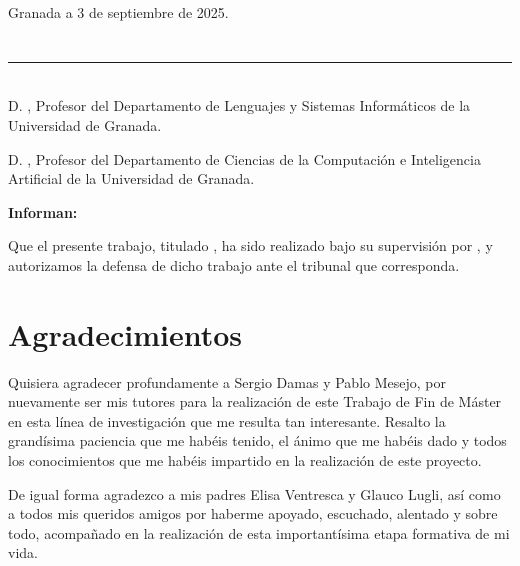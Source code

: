 \vspace{6cm}


\vspace{2cm}

\begin{flushright}
Granada a 3 de septiembre de 2025.
\end{flushright}


\chapter*{}
\thispagestyle{empty}

\noindent\rule[-1ex]{\textwidth}{2pt}\\[4.5ex]

D. \textbf{\myProf}, Profesor del Departamento de Lenguajes y Sistemas Informáticos de la Universidad de Granada.

\vspace{0.25cm}

D. \textbf{\myOtherProf}, Profesor del Departamento de Ciencias de la Computación e Inteligencia Artificial de la Universidad de Granada.


\vspace{0.25cm}

\textbf{Informan:}

\vspace{0.25cm}

Que el presente trabajo, titulado \textit{\textbf{\myTitle}},
ha sido realizado bajo su supervisión por \textbf{\myName}, y autorizamos la defensa de dicho trabajo ante el tribunal
que corresponda.

\vspace{0.5cm}


\vspace{0.5cm}


\vspace{5cm}


\chapter*{Agradecimientos}
\thispagestyle{empty}

\vspace{1cm}

Quisiera agradecer profundamente a Sergio Damas y Pablo Mesejo, por nuevamente ser mis tutores para la realización de este Trabajo de Fin de Máster en esta línea de investigación que me resulta tan interesante. Resalto la grandísima paciencia que me habéis tenido, el ánimo que me habéis dado y todos los conocimientos que me habéis impartido en la realización de este proyecto.

De igual forma agradezco a mis padres Elisa Ventresca y Glauco Lugli, así como a todos mis queridos amigos por haberme apoyado, escuchado, alentado y sobre todo, acompañado en la realización de esta importantísima etapa formativa de mi vida.